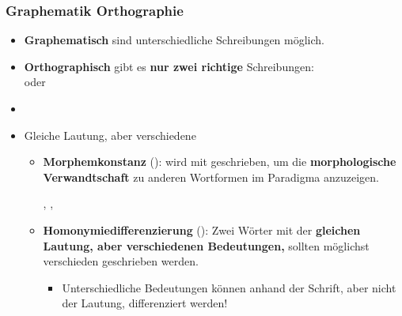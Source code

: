 \begin{frame}
\frametitle{Graphematik \vs Orthographie}

\begin{itemize}
	\item \textbf{Graphematisch} sind unterschiedliche Schreibungen möglich.

\pause 
	
	\item \textbf{Orthographisch} gibt es \textbf{nur zwei richtige} Schreibungen: \\
	 oder 
	\item[]
	\item Gleiche Lautung, aber verschiedene 
	
	\begin{itemize}
		\item \textbf{Morphemkonstanz} (\su):  wird mit  geschrieben, um die \textbf{morphologische Verwandtschaft} zu anderen Wortformen im Paradigma anzuzeigen.
		
		\ea {}, , 
		\z 

		\item \textbf{Homonymiedifferenzierung} (\su): Zwei Wörter mit der \textbf{gleichen Lautung, aber verschiedenen Bedeutungen,} sollten möglichst verschieden geschrieben werden.
		
		\begin{itemize}
			\item Unterschiedliche Bedeutungen können anhand der Schrift, aber nicht der Lautung, differenziert werden!
		\end{itemize}
	\end{itemize}
\end{itemize}

\end{frame}


